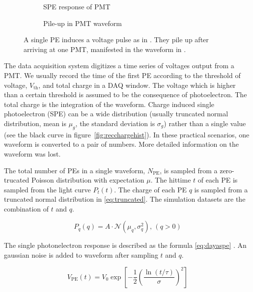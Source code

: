 \begin{figure}[H]
  \begin{subfigure}{.49\textwidth}
    \centering
    \resizebox{\textwidth}{!}{}
    \caption{\label{fig:spe} SPE response of PMT}
  \end{subfigure}
  \begin{subfigure}{.49\textwidth}
    \centering
    \resizebox{\textwidth}{!}{}
    \caption{\label{fig:pile} Pile-up in PMT waveform}
  \end{subfigure}
  \caption{A single PE induces a voltage pulse as in .  They pile up after arriving at one PMT, manifested in the waveform in .}
\end{figure}

The data acquisition system digitizes a time series of voltages output from a PMT. We usually record the time of the first PE according to the threshold of voltage, $V_\mathrm{th}$, and total charge in a DAQ window. The voltage which is higher than a certain threshold is assumed to be the consequence of photoelectron. The total charge is the integration of the waveform. Charge induced single photoelectron (SPE) can be a wide distribution (usually truncated normal distribution, mean is $\mu_{g}$, the standard deviation is $\sigma_{g}$) rather than a single value (see the black curve in figure~\ref{fig:recchargehist}). In these practical scenarios, one waveform is converted to a pair of numbers. More detailed information on the waveform was lost. 


The total number of PEs in a single waveform, $N_\mathrm{PE}$, is sampled from a zero-trucated Poisson distribution with expectation $\mu$. The hittime $t$ of each PE is sampled from the light curve $P_{t}(t)$. The charge of each PE $q$ is sampled from a truncated normal distribution in \eqref{eq:truncated}. The simulation datasets are the combination of $t$ and $q$.

\begin{equation}
    P_{q}(q) = A\cdot\mathcal{N}(\mu_{q},\sigma_{q}^{2}),\,(q>0)
    \label{eq:truncated}
\end{equation}

The single photonelectron response is described as the formula \eqref{eq:dayaspe} \cite{jetter_pmt_2012}. An gaussian noise is added to waveform after sampling $t$ and $q$. 

\begin{equation}
    V_\mathrm{PE}(t) = V_{0}\exp\left[-\frac{1}{2}\left(\frac{\ln(t/\tau)}{\sigma}\right)^{2}\right]
    \label{eq:dayaspe}
\end{equation}

